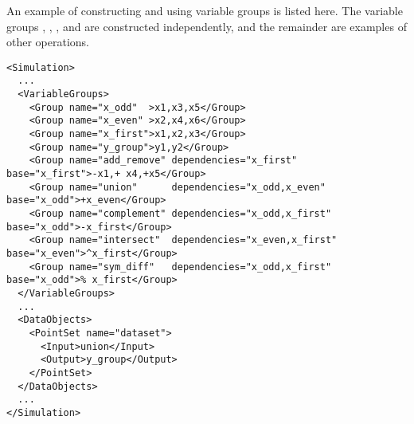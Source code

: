 An example of constructing and using variable groups is listed here.  The variable groups ,
, ,  and   are constructed independently, and the
remainder are examples of other operations.
\begin{lstlisting}[style=XML,morekeywords={name,file}] %moreemph={name,file}]
<Simulation>
  ...
  <VariableGroups>
    <Group name="x_odd"  >x1,x3,x5</Group>
    <Group name="x_even" >x2,x4,x6</Group>
    <Group name="x_first">x1,x2,x3</Group>
    <Group name="y_group">y1,y2</Group>
    <Group name="add_remove" dependencies="x_first"         base="x_first">-x1,+ x4,+x5</Group>
    <Group name="union"      dependencies="x_odd,x_even"    base="x_odd">+x_even</Group>
    <Group name="complement" dependencies="x_odd,x_first"   base="x_odd">-x_first</Group>
    <Group name="intersect"  dependencies="x_even,x_first"  base="x_even">^x_first</Group>
    <Group name="sym_diff"   dependencies="x_odd,x_first"   base="x_odd">% x_first</Group>
  </VariableGroups>
  ...
  <DataObjects>
    <PointSet name="dataset">
      <Input>union</Input>
      <Output>y_group</Output>
    </PointSet>
  </DataObjects>
  ...
</Simulation>
\end{lstlisting}
